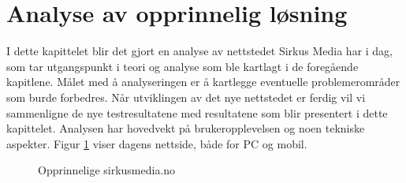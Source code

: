 \section{Analyse av opprinnelig løsning}

I dette kapittelet blir det gjort en analyse av nettstedet Sirkus Media har i dag, som tar utgangspunkt i teori og analyse som ble kartlagt i de foregående kapitlene. Målet med å analyseringen er å kartlegge eventuelle problemerområder som burde forbedres. Når utviklingen av det nye nettstedet er ferdig vil vi sammenligne de nye testresultatene med resultatene som blir presentert i dette kapittelet. Analysen har hovedvekt på brukeropplevelsen og noen tekniske aspekter.
Figur \ref{fig:analysis-current-sirkusmedia.no} viser dagens nettside, både for PC og mobil.

\begin{figure}[H]
    \begin{center}
        \label{fig:analysis-current-sirkusmedia.no}
        \caption{Opprinnelige sirkusmedia.no}
    \end{center}
\end{figure}

